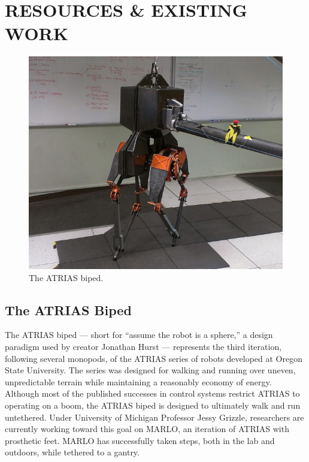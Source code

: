 \documentclass[letterpaper, 10 pt, conference]{ieeeconf}  %
\begin{document}
\section{RESOURCES \& EXISTING WORK}

   \begin{figure}[thpb]
      \centering
      \includegraphics[scale=0.3]{figures/atrias.jpg}
      \caption{The ATRIAS biped.}
      \label{atrias}
   \end{figure}

\subsection{The ATRIAS Biped}

The ATRIAS biped --- short for “assume the robot is a sphere,” a design paradigm used by creator Jonathan Hurst --- represents the third iteration, following several monopods, of the ATRIAS series of robots developed at Oregon State University. The series was designed for walking and running over uneven, unpredictable terrain while maintaining a reasonably economy of energy. \cite{site1} Although most of the published successes in control systems restrict ATRIAS to operating on a boom, the ATRIAS biped is designed to ultimately walk and run untethered. Under University of Michigan Professor Jessy Grizzle, researchers are currently working toward this goal on MARLO, an iteration of ATRIAS with prosthetic feet. MARLO has successfully taken steps, both in the lab and outdoors, while tethered to a gantry. \cite{site2}
\end{document}
